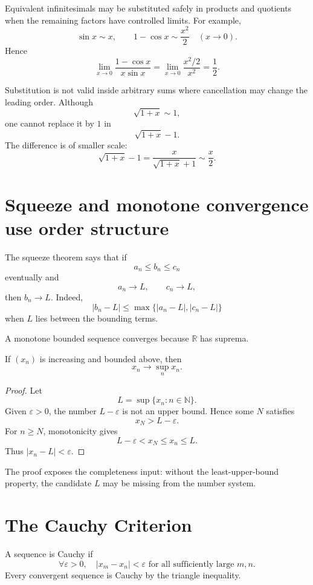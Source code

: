 Equivalent infinitesimals may be substituted safely in products and quotients when the remaining factors have controlled limits.  For example,
\[
  \sin x\sim x,
  \qquad
  1-\cos x\sim\frac{x^2}{2}
  \quad(x\to0).
\]
Hence
\[
  \lim_{x\to0}
  \frac{1-\cos x}{x\sin x}
  =\lim_{x\to0}
  \frac{x^2/2}{x^2}
  =\frac12.
\]

Substitution is not valid inside arbitrary sums where cancellation may change the leading order.  Although
\[
  \sqrt{1+x}\sim1,
\]
one cannot replace it by \(1\) in
\[
  \sqrt{1+x}-1.
\]
The difference is of smaller scale:
\[
  \sqrt{1+x}-1
  =\frac{x}{\sqrt{1+x}+1}
  \sim\frac x2.
\]

\section{Squeeze and monotone convergence use order structure}

The squeeze theorem says that if
\[
  a_n\le b_n\le c_n
\]
eventually and
\[
  a_n\to L,
  \qquad
  c_n\to L,
\]
then \(b_n\to L\).  Indeed,
\[
  |b_n-L|
  \le\max\{|a_n-L|,|c_n-L|\}
\]
when \(L\) lies between the bounding terms.

A monotone bounded sequence converges because \(\mathbb R\) has suprema.

\begin{theorem}
If \((x_n)\) is increasing and bounded above, then
\[
  x_n\to\sup_n x_n.
\]
\end{theorem}

\begin{proof}
Let
\[
  L=\sup\{x_n:n\in\mathbb N\}.
\]
Given \(\varepsilon>0\), the number \(L-\varepsilon\) is not an upper bound.  Hence some \(N\) satisfies
\[
  x_N>L-\varepsilon.
\]
For \(n\ge N\), monotonicity gives
\[
  L-\varepsilon<x_N\le x_n\le L.
\]
Thus \(|x_n-L|<\varepsilon\).
\end{proof}

The proof exposes the completeness input: without the least-upper-bound property, the candidate \(L\) may be missing from the number system.

\section{The Cauchy Criterion}

A sequence is Cauchy if
\[
  \forall\varepsilon>0,
  \quad
  |x_m-x_n|<\varepsilon
  \text{ for all sufficiently large }m,n.
\]
Every convergent sequence is Cauchy by the triangle inequality.

